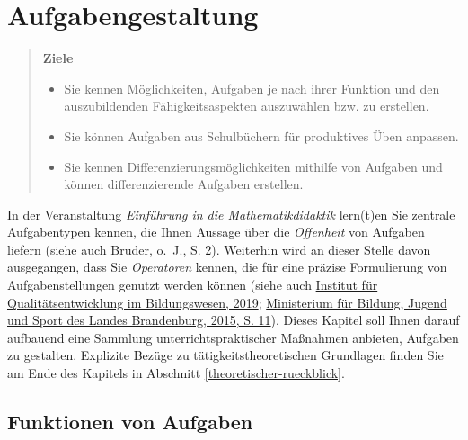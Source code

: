 \documentclass[
]{scrbook}
\providecommand{\tightlist}{%
  \setlength{\itemsep}{0pt}\setlength{\parskip}{0pt}}
\theoremstyle{definition}
\theoremstyle{definition}
\theoremstyle{definition}
\theoremstyle{definition}
\theoremstyle{remark}
\begin{document}
\hypertarget{aufgabengestaltung}{%
\chapter{Aufgabengestaltung}\label{aufgabengestaltung}}

\begin{quote}
\textbf{Ziele}

\begin{itemize}
\tightlist
\item
  Sie kennen Möglichkeiten, Aufgaben je nach ihrer Funktion und den auszubildenden Fähigkeitsaspekten auszuwählen bzw. zu erstellen.
\item
  Sie können Aufgaben aus Schulbüchern für produktives Üben anpassen.
\item
  Sie kennen Differenzierungsmöglichkeiten mithilfe von Aufgaben und können differenzierende Aufgaben erstellen.
\end{itemize}
\end{quote}

In der Veranstaltung \emph{Einführung in die Mathematikdidaktik} lern(t)en Sie zentrale Aufgabentypen kennen, die Ihnen Aussage über die \emph{Offenheit} von Aufgaben liefern (siehe auch \protect\hyperlink{ref-Bruder}{Bruder, o.~J., S. 2}). Weiterhin wird an dieser Stelle davon ausgegangen, dass Sie \emph{Operatoren} kennen, die für eine präzise Formulierung von Aufgabenstellungen genutzt werden können (siehe auch \protect\hyperlink{ref-InstitutfurQualitatsentwicklungimBildungswesen2019}{Institut für Qualitätsentwicklung im Bildungswesen, 2019}; \protect\hyperlink{ref-MinisteriumfurBildungJugendundSportdesLandesBrandenburg}{Ministerium für Bildung, Jugend und Sport des Landes Brandenburg, 2015, S. 11}). Dieses Kapitel soll Ihnen darauf aufbauend eine Sammlung unterrichtspraktischer Maßnahmen anbieten, Aufgaben zu gestalten. Explizite Bezüge zu tätigkeitstheoretischen Grundlagen finden Sie am Ende des Kapitels in Abschnitt \ref{theoretischer-rueckblick}.

\hypertarget{funktionen-von-aufgaben}{%
\section{Funktionen von Aufgaben}\label{funktionen-von-aufgaben}}
\end{document}
